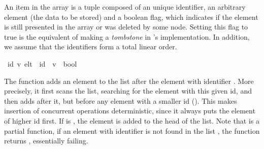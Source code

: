 \documentclass[acmlarge,review,anonymous]{acmart}\settopmatter{printfolios=true}
\begin{document}
An item in the array is a tuple composed of an unique identifier, an arbitrary
element (the data to be stored) and a boolean flag, which indicates if the
element is still presented in the array or was deleted by some node.  Setting
this flag to true is the equivalent of making a \emph{tombstone} in
\cite{Roh:2011dw}'s implementation. In addition, we assume that the identifiers
form a total linear order.

\begin{isabellebody}
\isanewline
{}\isamarkupfalse%
\ {\isacharparenleft}{\isacharprime}id{\isacharcomma}\ {\isacharprime}v{\isacharparenright}\ elt\ {\isacharequal}\ {\isachardoublequoteopen}{\isacharprime}id\ {\isasymtimes}\ {\isacharprime}v\ {\isasymtimes}\ bool{\isachardoublequoteclose}%
\isanewline
\end{isabellebody}

The function  adds an element  to the list
 after the element with identifier . More precisely, it first
scans the list, searching for the element with this given id, and then adds
after it, but before any element with a smaller id (). This
makes insertion of concurrent operations deterministic, since it always puts
the element of higher id first.  If  is , the element is added
to the head of the list.  Note that  is a partial function, if an
element with identifier  is not found in the list , the function
returns , essentially failing.
\end{document}
